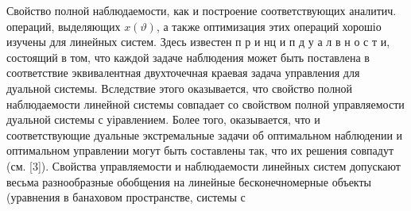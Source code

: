 \documentclass[10pt]{article}
\begin{document}
Свойство полной наблюдаемости, как и построение соответствующих аналитич. операций, выделяющих $x(\vartheta)$, а также оптимизация этих операций хорошіо изучены для линейных систем. Здесь известен п р и нц и п д у а л в н о с т и, состоящий в том, что каждой задаче наблюдения может быть поставлена в соответствие эквивалентная двухточечная краевая задача управления для дуальной системы. Вследствие этого оказывается, что свойство полной наблюдаемости линейной системы совпадает со свойством полной управляемости дуальной системы с уіравлением. Более того, оказывается, что и соответствующие дуальные экстремальные задачи об оптимальном наблюдении и оптимальном управлении могут быть составлены так, что их решения совпадут (см. [3]). Свойства управляемости и наблюдаемости линейных систем допускают весьма разнообразные обобщения на линейные бесконечномерные объекты (уравнения в банаховом пространстве, системы с
\end{document}
